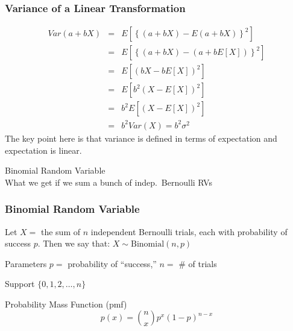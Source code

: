 \documentclass[handout]{beamer}
\begin{document}
\begin{frame}
\frametitle{Variance of a Linear Transformation}

\begin{eqnarray*}
 Var(a + bX) &=& E\left[\left\{(a+bX) - E(a+bX)\right\}^2 \right] \\ 
 	&=& E\left[\left\{(a+bX) - (a+bE[X])\right\}^2 \right] \\
 	&=&E\left[\left(bX - bE[X]\right)^2 \right] \\ 
 	&=&E[b^2 (X - E[X])^2]\\ 
 	&=& b^2 E[(X-E[X])^2]\\ 
 	&=& b^2 Var(X) = b^2 \sigma^2
\end{eqnarray*}
\alert{The key point here is that variance is defined in terms of expectation and expectation is linear.}

\end{frame}
\begin{frame}
	\begin{center}
		\Huge Binomial Random Variable	\\
		\large What we get if we sum a bunch of indep.\ Bernoulli RVs
	\end{center}
\end{frame}


\begin{frame}
\frametitle{Binomial Random Variable}
Let $X = $ the sum of $n$ independent Bernoulli trials, each with probability of success $p$.  \alert{Then we say that:
		$X \sim \mbox{Binomial}(n,p)$} 

\vspace{2em}
\begin{block}{Parameters}
$p =$ probability of ``success,'' $n=$ \# of trials
\end{block}
\begin{block}{Support} 
$\{0, 1, 2, \hdots, n\}$ 
\end{block}
\begin{block}{Probability Mass Function (pmf)} 
$$p(x) = {n \choose x} p^x (1-p)^{n-x}$$ 
\end{block}
\end{frame}
\end{document}
